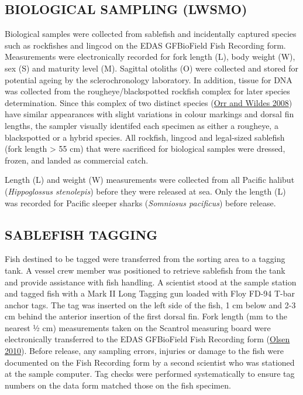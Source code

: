 \documentclass[12pt]{article}\usepackage[]{graphicx}\usepackage[]{color}
\begin{document}
\hypertarget{biological-sampling-lwsmo}{%
\subsection{BIOLOGICAL SAMPLING (LWSMO)}\label{biological-sampling-lwsmo}}

Biological samples were collected from sablefish and incidentally captured species such as rockfishes and lingcod on the EDAS GFBioField Fish Recording form. Measurements were electronically recorded for fork length (L), body weight (W), sex (S) and maturity level (M). Sagittal otoliths (O) were collected and stored for potential ageing by the sclerochronology laboratory. In addition, tissue for DNA was collected from the rougheye/blackspotted rockfish complex for later species determination. Since this complex of two distinct species (\protect\hyperlink{ref-Orr2008}{Orr and Wildes 2008}) have similar appearances with slight variations in colour markings and dorsal fin lengths, the sampler visually identifed each specimen as either a rougheye, a blackspotted or a hybrid species. All rockfish, lingcod and legal-sized sablefish (fork length \textgreater{} 55 cm) that were sacrificed for biological samples were dressed, frozen, and landed as commercial catch.

Length (L) and weight (W) measurements were collected from all Pacific halibut (\emph{Hippoglossus stenolepis}) before they were released at sea. Only the length (L) was recorded for Pacific sleeper sharks (\emph{Somniosus pacificus}) before release.

\hypertarget{sablefish-tagging}{%
\subsection{SABLEFISH TAGGING}\label{sablefish-tagging}}

Fish destined to be tagged were transferred from the sorting area to a tagging tank. A vessel crew member was positioned to retrieve sablefish from the tank and provide assistance with fish handling. A scientist stood at the sample station and tagged fish with a Mark II Long Tagging gun loaded with Floy FD-94 T-bar anchor tags. The tag was inserted on the left side of the fish, 1 cm below and 2-3 cm behind the anterior insertion of the first dorsal fin. Fork length (mm to the nearest ½ cm) measurements taken on the Scantrol measuring board were electronically transferred to the EDAS GFBioField Fish Recording form (\protect\hyperlink{ref-Olsen2010}{Olsen 2010}). Before release, any sampling errors, injuries or damage to the fish were documented on the Fish Recording form by a second scientist who was stationed at the sample computer. Tag checks were performed systematically to ensure tag numbers on the data form matched those on the fish specimen.
\end{document}
